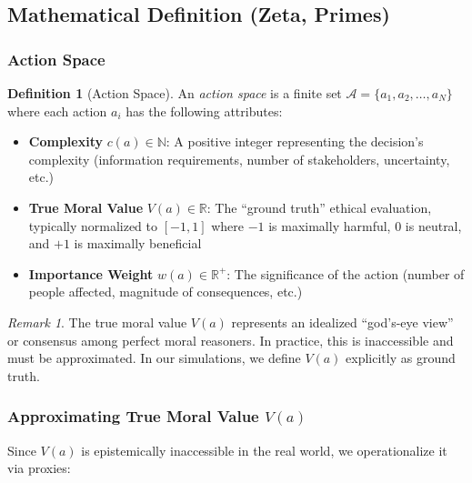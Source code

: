 \documentclass[12pt,a4paper]{article}
\theoremstyle{definition}
\newtheorem{definition}[theorem]{Definition}
\theoremstyle{remark}
\newtheorem{remark}[theorem]{Remark}
\begin{document}
\subsection{Mathematical Definition (Zeta, Primes)}
\label{sec:formalization}

\subsubsection{Action Space}

\begin{definition}[Action Space]
An \emph{action space} is a finite set $\mathcal{A} = \{a_1, a_2, \ldots, a_N\}$ where each action $a_i$ has the following attributes:
\begin{itemize}
    \item \textbf{Complexity} $c(a) \in \mathbb{N}$: A positive integer representing the decision's complexity (information requirements, number of stakeholders, uncertainty, etc.)
    \item \textbf{True Moral Value} $V(a) \in \mathbb{R}$: The ``ground truth'' ethical evaluation, typically normalized to $[-1, 1]$ where $-1$ is maximally harmful, $0$ is neutral, and $+1$ is maximally beneficial
    \item \textbf{Importance Weight} $w(a) \in \mathbb{R}^+$: The significance of the action (number of people affected, magnitude of consequences, etc.)
\end{itemize}
\end{definition}

\begin{remark}
The true moral value $V(a)$ represents an idealized ``god's-eye view'' or consensus among perfect moral reasoners. In practice, this is inaccessible and must be approximated. In our simulations, we define $V(a)$ explicitly as ground truth.
\end{remark}

\subsubsection{Approximating True Moral Value $V(a)$}
\label{sec:approximating-v}

Since $V(a)$ is epistemically inaccessible in the real world, we operationalize it via proxies:
\end{document}
